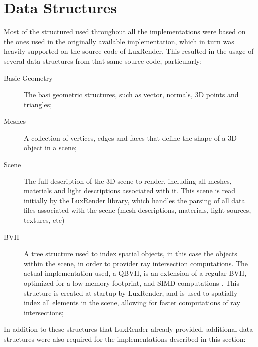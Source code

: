 \documentclass[main.tex]{subfiles}
\begin{document}
\section{Data Structures} \label{section:data_structures}

Most of the structured used throughout all the implementations were based on the ones used in the originally available implementation, which in turn was heavily supported on the source code of LuxRender. This resulted in the usage of several data structures from that same source code, particularly:

\begin{description}
\item[Basic Geometry] The basi geometric structures, such as vector, normals, 3D points and triangles;

\item[Meshes] A collection of vertices, edges and faces that define the shape of a 3D object in a scene;

\item[Scene] The full description of the 3D scene to render, including all meshes, materials and light descriptions associated with it. This scene is read initially by the LuxRender library, which handles the parsing of all data files associated with the scene (mesh descriptions, materials, light sources, textures, etc)

\item[\acl{BVH}] A tree structure used to index spatial objects, in this case the objects within the scene, in order to provider ray intersection computations. The actual implementation used, a \acf{QBVH}, is an extension of a regular \acs{BVH}, optimized for a low memory footprint, and \acs{SIMD} computations \cite{dammertz2008shallow,Stich2009hpg}. This structure is created at startup by LuxRender, and is used to spatially index all elements in the scene, allowing for faster computations of ray intersections;

\end{description}

In addition to these structures that LuxRender already provided, additional data structures were also required for the implementations described in this section:
\end{document}
